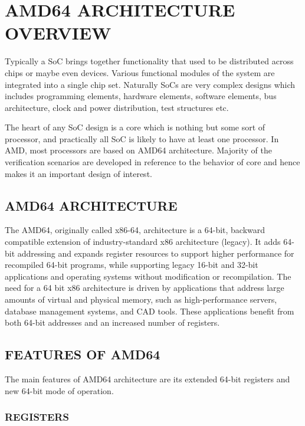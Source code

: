 \documentclass[a4paper,12pt]{report}
\begin{document}
\chapter*{\centering \Large{AMD64 ARCHITECTURE OVERVIEW}}
\label{chap:amd64}
Typically a SoC brings together functionality that used to be distributed across chips or maybe even devices. Various functional modules of the system are integrated into a single chip set. Naturally SoCs are very complex designs which includes programming elements, hardware elements, software elements, bus architecture, clock and power distribution, test structures etc. 

The heart of any SoC design is a core which is nothing but some sort of processor, and practically all SoC is likely to have at least one processor. In AMD, most processors are based on AMD64 architecture. Majority of the verification scenarios are developed in reference to the behavior of core and hence makes it an important design of interest.

\section {AMD64 ARCHITECTURE}
The AMD64, originally called x86-64, architecture is a 64-bit, backward compatible extension of industry-standard x86 architecture (legacy). It adds 64-bit addressing and expands register resources to support higher performance for recompiled 64-bit programs, while supporting legacy 16-bit and 32-bit applications and operating systems without modification or recompilation. The need for a 64 bit x86 architecture is driven by applications that address large amounts of virtual and physical memory, such as high-performance servers, database management systems, and CAD tools. These applications benefit from both 64-bit addresses and an increased number of registers.



\section {FEATURES OF AMD64}
The main features of AMD64 architecture are its extended 64-bit registers and new 64-bit mode of operation.  
\subsection{REGISTERS}
\end{document}
